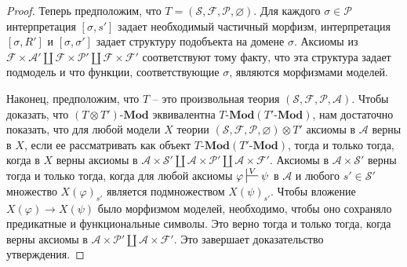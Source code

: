\documentclass[reqno]{amsart}
\theoremstyle{definition}
\theoremstyle{remark}
\newcommand{\bcat}[1]{\mathbf{#1}}
\newcommand{\Mod}[1]{#1\text{-}\bcat{Mod}}
\begin{document}
\begin{proof}
Теперь предположим, что $T = (\mathcal{S},\mathcal{F},\mathcal{P},\varnothing)$.
Для каждого $\sigma \in \mathcal{P}$ интерпретация $[\sigma,s']$ задает необходимый частичный морфизм, интерпретация $[\sigma,R']$ и $[\sigma,\sigma']$ задает структуру подобъекта на домене $\sigma$.
Аксиомы из $\mathcal{F} \times \mathcal{A}' \amalg \mathcal{F} \times \mathcal{P}' \amalg \mathcal{F} \times \mathcal{F}'$ соответствуют тому факту, что эта структура задает подмодель и что функции, соответствующие $\sigma$, являются морфизмами моделей.

Наконец, предположим, что $T$ -- это произвольная теория $(\mathcal{S},\mathcal{F},\mathcal{P},\mathcal{A})$.
Чтобы доказать, что $\Mod{(T \otimes T')}$ эквивалентна $\Mod{T}(\Mod{T'})$, нам достаточно показать, что для любой модели $X$ теории $(\mathcal{S},\mathcal{F},\mathcal{P},\varnothing) \otimes T'$
аксиомы в $\mathcal{A}$ верны в $X$, если ее рассматривать как объект $\Mod{T}(\Mod{T'})$, тогда и только тогда, когда в $X$ верны аксиомы в $\mathcal{A} \times \mathcal{S}' \amalg \mathcal{A} \times \mathcal{P}' \amalg \mathcal{A} \times \mathcal{F}'$.
Аксиомы в $\mathcal{A} \times \mathcal{S}'$ верны тогда и только тогда, когда для любой аксиомы $\varphi \sststile{}{V} \psi$ в $\mathcal{A}$ и любого $s' \in \mathcal{S}'$ множество $X(\varphi)_{s'}$ является подмножеством $X(\psi)_{s'}$.
Чтобы вложение $X(\varphi) \to X(\psi)$ было морфизмом моделей, необходимо, чтобы оно сохраняло предикатные и функциональные символы.
Это верно тогда и только тогда, когда верны аксиомы в $\mathcal{A} \times \mathcal{P}' \amalg \mathcal{A} \times \mathcal{F}'$.
Это завершает доказательство утверждения.
\end{proof}
\end{document}
